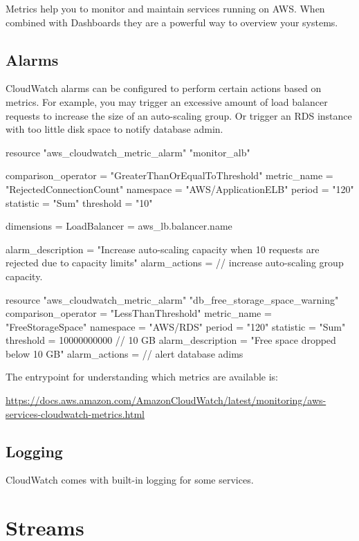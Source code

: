 \documentclass{csse4400}
\begin{document}
Metrics help you to monitor and maintain services running on AWS.
When combined with Dashboards they are a powerful way to overview your systems.

\subsection{Alarms}
CloudWatch alarms can be configured to perform certain actions based on metrics.
For example, you may trigger an excessive amount of load balancer requests to increase the size of an auto-scaling group.
Or trigger an RDS instance with too little disk space to notify database admin.

\begin{code}[language=terraform]{}
resource "aws_cloudwatch_metric_alarm" "monitor_alb" {
  comparison_operator = "GreaterThanOrEqualToThreshold"
  metric_name         = "RejectedConnectionCount"
  namespace           = "AWS/ApplicationELB"
  period              = "120"
  statistic           = "Sum"
  threshold           = "10"

  dimensions = {
    LoadBalancer = aws_lb.balancer.name
  }

  alarm_description = "Increase auto-scaling capacity when 10 requests are rejected due to capacity limits"
  alarm_actions     = // increase auto-scaling group capacity.
}

resource "aws_cloudwatch_metric_alarm" "db_free_storage_space_warning" {
  comparison_operator = "LessThanThreshold"
  metric_name         = "FreeStorageSpace"
  namespace           = "AWS/RDS"
  period              = "120"
  statistic           = "Sum"
  threshold           = 10000000000 // 10 GB
  alarm_description   = "Free space dropped below 10 GB"
  alarm_actions       = // alert database adims
}
\end{code}

\noindent The entrypoint for understanding which metrics are available is:

\url{https://docs.aws.amazon.com/AmazonCloudWatch/latest/monitoring/aws-services-cloudwatch-metrics.html}

\subsection{Logging}
CloudWatch comes with built-in logging for some services.


\section{Streams}
\end{document}
